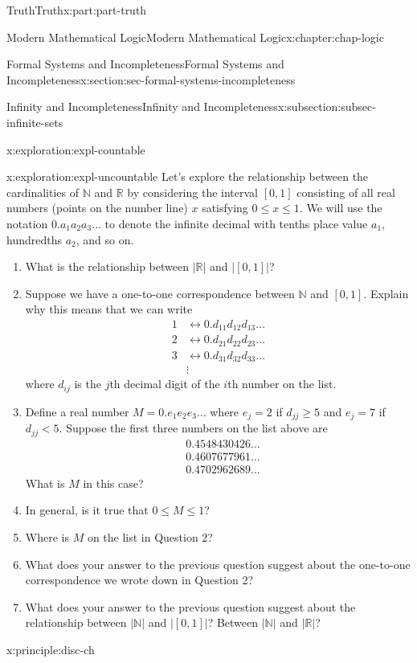 \documentclass[oneside,10pt,]{book}
\numberwithin{equation}{section}
\renewcommand{\le}{\leqslant}
\renewcommand{\ge}{\geqslant}
\newcommand{\lt}{<}
\newcommand{\amp}{&}
\begin{document}
\begin{partptx}{Truth}{}{Truth}{}{}{x:part:part-truth}
\begin{chapterptx}{Modern Mathematical Logic}{}{Modern Mathematical Logic}{}{}{x:chapter:chap-logic}
\begin{sectionptx}{Formal Systems and Incompleteness}{}{Formal Systems and Incompleteness}{}{}{x:section:sec-formal-systems-incompleteness}
\begin{subsectionptx}{Infinity and Incompleteness}{}{Infinity and Incompleteness}{}{}{x:subsection:subsec-infinite-sets}
\begin{exploration}{}{x:exploration:expl-countable}
\end{exploration}%
\begin{exploration}{}{x:exploration:expl-uncountable}%
Let's explore the relationship between the cardinalities of \(\mathbb{N}\) and \(\mathbb{R}\) by considering the interval \([0,1]\) consisting of all real numbers (points on the number line) \(x\) satisfying \(0 \le x \le 1\). We will use the notation \(0.a_1 a_2 a_3 \ldots\) to denote the infinite decimal with tenths place value \(a_1\), hundredths \(a_2\), and so on.%
%
\begin{enumerate}
\item{}What is the relationship between \(|\mathbb{R}|\) and \(|[0,1]|\)?%
\item{}Suppose we have a one-to-one correspondence between \(\mathbb{N}\) and \([0,1]\). Explain why this means that we can write%
\begin{align*}
1 \amp \leftrightarrow 0.d_{11}d_{12}d_{13}\ldots\\
2 \amp \leftrightarrow 0.d_{21}d_{22}d_{23}\ldots\\
3 \amp \leftrightarrow 0.d_{31}d_{32}d_{33}\ldots\\
\amp \vdots 
\end{align*}
where \(d_{ij}\) is the \(j\)th decimal digit of the \(i\)th number on the list.%
\item{}Define a real number \(M = 0.e_1 e_2 e_3 \ldots\) where \(e_j = 2\) if \(d_{jj} \ge 5\) and \(e_j = 7\) if \(d_{jj} \lt 5\). Suppose the first three numbers on the list above are%
\begin{align*}
\amp 0.4548430426\ldots\\
\amp 0.4607677961\ldots\\
\amp 0.4702962689\ldots
\end{align*}
What is \(M\) in this case?%
\item{}In general, is it true that \(0 \le M \le 1\)?%
\item{}Where is \(M\) on the list in Question 2?%
\item{}What does your answer to the previous question suggest about the one-to-one correspondence we wrote down in Question 2?%
\item{}What does your answer to the previous question suggest about the relationship between \(|\mathbb{N}|\) and \(|[0,1]|\)? Between \(|\mathbb{N}|\) and \(|\mathbb{R}|\)?%
\end{enumerate}
\end{exploration}%
\begin{principle}{}{}{x:principle:disc-ch}%

\end{principle}
\end{subsectionptx}
\end{sectionptx}
\end{chapterptx}
\end{partptx}
\end{document}
